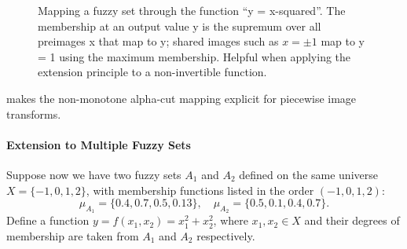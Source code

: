 \begin{figure}[t]
    \centering
    \caption{Mapping a fuzzy set through the function ``y = x-squared''. The membership at an output value y is the supremum over all preimages x that map to y; shared images such as \(x=\pm 1\) map to y = 1 using the maximum membership. Helpful when applying the extension principle to a non-invertible function.}
    \label{fig:lec10-extension}
\end{figure}


 makes the non-monotone alpha-cut mapping explicit for piecewise image transforms.

\paragraph{Extension to Multiple Fuzzy Sets}

Suppose now we have two fuzzy sets \( A_1 \) and \( A_2 \) defined on the same universe \( X = \{-1, 0, 1, 2\} \), with membership functions listed in the order \((-1,0,1,2)\):
\[
\mu_{A_1} = \{0.4, 0.7, 0.5, 0.13\}, \quad \mu_{A_2} = \{0.5, 0.1, 0.4, 0.7\}.
\]
Define a function \( y = f(x_1, x_2) = x_1^2 + x_2^2 \), where \( x_1, x_2 \in X \) and their degrees of membership are taken from \(A_1\) and \(A_2\) respectively.\allowbreak


